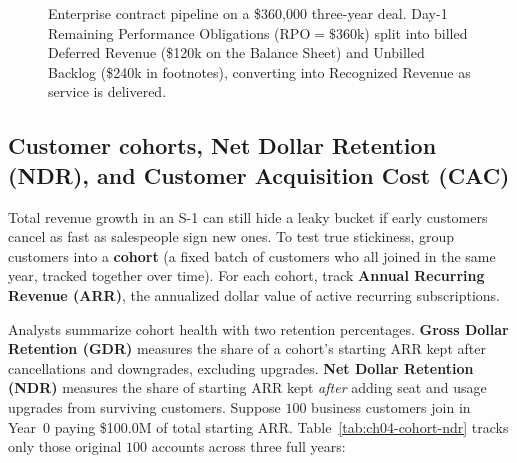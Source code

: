 \begin{figure}[htbp]
\caption{Enterprise contract pipeline on a \$360,000 three-year deal. Day-1 Remaining Performance Obligations ($\text{RPO} = \$360\text{k}$) split into billed Deferred Revenue (\$120k on the Balance Sheet) and Unbilled Backlog (\$240k in footnotes), converting into Recognized Revenue as service is delivered.}
\label{fig:ch04-rpo-pipeline}
\end{figure}

\subsection{Customer cohorts, Net Dollar Retention (NDR), and Customer Acquisition Cost (CAC)}

Total revenue growth in an S-1 can still hide a leaky bucket if early customers cancel as fast as salespeople sign new ones. To test true stickiness, group customers into a \textbf{cohort} (a fixed batch of customers who all joined in the same year, tracked together over time). For each cohort, track \textbf{Annual Recurring Revenue (ARR)}, the annualized dollar value of active recurring subscriptions.

Analysts summarize cohort health with two retention percentages. \textbf{Gross Dollar Retention (GDR)} measures the share of a cohort's starting ARR kept after cancellations and downgrades, excluding upgrades. \textbf{Net Dollar Retention (NDR)} measures the share of starting ARR kept \emph{after} adding seat and usage upgrades from surviving customers. Suppose $100$ business customers join in Year~0 paying \$100.0M of total starting ARR. Table~\ref{tab:ch04-cohort-ndr} tracks only those original $100$ accounts across three full years:

